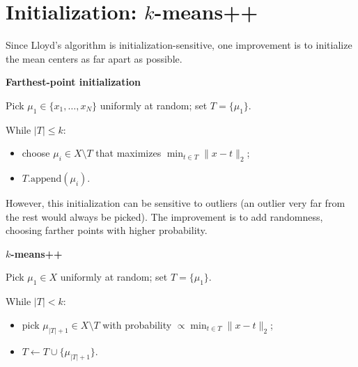 \documentclass[
  letterpaper,
  DIV=11,
  numbers=noendperiod]{scrreprt}
\providecommand{\tightlist}{%
  \setlength{\itemsep}{0pt}\setlength{\parskip}{0pt}}
\theoremstyle{definition}
\theoremstyle{plain}
\theoremstyle{plain}
\theoremstyle{definition}
\theoremstyle{plain}
\theoremstyle{plain}
\theoremstyle{remark}
\begin{document}
\section{\texorpdfstring{Initialization:
\(k\)-means++}{Initialization: k-means++}}\label{initialization-k-means}

Since Lloyd's algorithm is initialization-sensitive, one improvement is
to initialize the mean centers as far apart as possible.

\begin{tcolorbox}[enhanced jigsaw, leftrule=.75mm, bottomrule=.15mm, left=2mm, colback=white, colframe=quarto-callout-note-color-frame, toprule=.15mm, breakable, arc=.35mm, rightrule=.15mm, opacityback=0]
\begin{minipage}[t]{5.5mm}
\textcolor{quarto-callout-note-color}{\faInfo}
\end{minipage}%
\begin{minipage}[t]{\textwidth - 5.5mm}

\textbf{Farthest-point initialization}

Pick \(\mu_1 \in \{x_1, \dots, x_N\}\) uniformly at random; set
\(T = \{\mu_1\}\).

While \(|T| \le k\):

\begin{itemize}
\tightlist
\item
  choose \(\mu_i \in X \setminus T\) that maximizes
  \(\min_{t \in T} \|x - t\|_2\);
\item
  \(T.\text{append}(\mu_i)\).
\end{itemize}

\end{minipage}%
\end{tcolorbox}

However, this initialization can be sensitive to outliers (an outlier
very far from the rest would always be picked). The improvement is to
add randomness, choosing farther points with higher probability.

\begin{tcolorbox}[enhanced jigsaw, leftrule=.75mm, bottomrule=.15mm, left=2mm, colback=white, colframe=quarto-callout-note-color-frame, toprule=.15mm, breakable, arc=.35mm, rightrule=.15mm, opacityback=0]
\begin{minipage}[t]{5.5mm}
\textcolor{quarto-callout-note-color}{\faInfo}
\end{minipage}%
\begin{minipage}[t]{\textwidth - 5.5mm}

\textbf{\(k\)-means++}

Pick \(\mu_1 \in X\) uniformly at random; set \(T = \{\mu_1\}\).

While \(|T| < k\):

\begin{itemize}
\tightlist
\item
  pick \(\mu_{|T|+1} \in X \setminus T\) with probability
  \(\propto \min_{t \in T} \|x - t\|_2\);
\item
  \(T \leftarrow T \cup \{\mu_{|T|+1}\}\).
\end{itemize}

\end{minipage}%
\end{tcolorbox}
\end{document}
